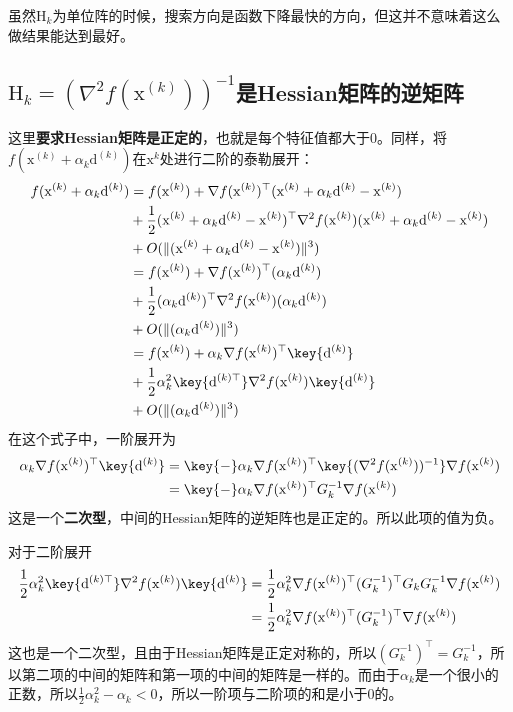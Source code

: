 \documentclass[a4paper]{D:/repositories/MyDGP/latex/PaperReadingLog}
\begin{document}
虽然$\mathrm{H}_k$为单位阵的时候，搜索方向是函数下降最快的方向，但这并不意味着这么做结果能达到最好。


\subsection{$\mathrm{H}_k=(\nabla^2f(\mathrm{x}^{(k)}))^{-1}$是Hessian矩阵的逆矩阵}
这里\textbf{要求Hessian矩阵是正定的}，也就是每个特征值都大于0。同样，将$f(\mathrm{x}^{(k)}+\alpha_k\mathrm{d}^{(k)})$在$\mathrm{x}^k$处进行二阶的泰勒展开：
$$
\begin{aligned}
    f(\mathrm{x}^{(k)}+\alpha_k\mathrm{d}^{(k)})&=f(\mathrm{x}^{(k)})+\nabla f(\mathrm{x}^{(k)})^\top(\mathrm{x}^{(k)}+\alpha_k\mathrm{d}^{(k)}-\mathrm{x}^{(k)})\\
    &+\frac{1}{2}(\mathrm{x}^{(k)}+\alpha_k\mathrm{d}^{(k)}-\mathrm{x}^{(k)})^\top\nabla^2 f(\mathrm{x}^{(k)})(\mathrm{x}^{(k)}+\alpha_k\mathrm{d}^{(k)}-\mathrm{x}^{(k)})\\
    &+O(\lVert (\mathrm{x}^{(k)}+\alpha_k\mathrm{d}^{(k)}-\mathrm{x}^{(k)}) \lVert ^3)\\
    &= f(\mathrm{x}^{(k)})+\nabla f(\mathrm{x}^{(k)})^\top(\alpha_k\mathrm{d}^{(k)})\\
    &+\frac{1}{2}(\alpha_k\mathrm{d}^{(k)})^\top\nabla^2 f(\mathrm{x}^{(k)})(\alpha_k\mathrm{d}^{(k)})\\
    &+O(\lVert (\alpha_k\mathrm{d}^{(k)}) \lVert ^3)\\
    &= f(\mathrm{x}^{(k)})+\alpha_k\nabla f(\mathrm{x}^{(k)})^\top\key{\mathrm{d}^{(k)}}\\
    &+\frac{1}{2}\alpha_k^2\key{\mathrm{d}^{(k)\top}}\nabla^2 f(\mathrm{x}^{(k)})\key{\mathrm{d}^{(k)}}\\
    &+O(\lVert (\alpha_k\mathrm{d}^{(k)}) \lVert ^3)\\
\end{aligned}
$$
在这个式子中，一阶展开为
$$
\begin{aligned}
    \alpha_k\nabla f(\mathrm{x}^{(k)})^\top\key{\mathrm{d}^{(k)}}&=\key{-}\alpha_k\nabla f(\mathrm{x}^{(k)})^\top\key{(\nabla^2f(\mathrm{x}^{(k)}))^{-1}}\nabla f(\mathrm{x}^{(k)})\\
    &=\key{-}\alpha_k\nabla f(\mathrm{x}^{(k)})^\top G_k^{-1}\nabla f(\mathrm{x}^{(k)})
\end{aligned}
$$
这是一个\textbf{二次型}，中间的Hessian矩阵的逆矩阵也是正定的。所以此项的值为负。

对于二阶展开
$$
\begin{aligned}
    \frac{1}{2}\alpha_k^2\key{\mathrm{d}^{(k)\top}}\nabla^2 f(\mathrm{x}^{(k)})\key{\mathrm{d}^{(k)}}&=\frac{1}{2}\alpha_k^2\nabla f(\mathrm{x}^{(k)})^\top (G_k^{-1})^\top G_k G_k^{-1} \nabla f(\mathrm{x}^{(k)})\\
    &=\frac{1}{2}\alpha_k^2\nabla f(\mathrm{x}^{(k)})^\top (G_k^{-1})^\top \nabla f(\mathrm{x}^{(k)})
\end{aligned}
$$
这也是一个二次型，且由于Hessian矩阵是正定对称的，所以$(G_k^{-1})^\top=G_k^{-1}$，所以第二项的中间的矩阵和第一项的中间的矩阵是一样的。而由于$\alpha_k$是一个很小的正数，所以$\frac{1}{2}\alpha_k^2-\alpha_k<0$，所以一阶项与二阶项的和是小于0的。
\end{document}
